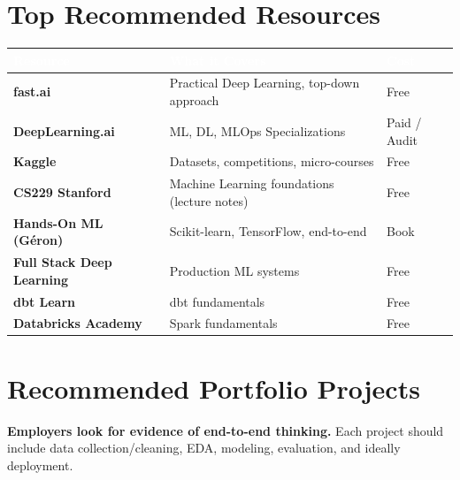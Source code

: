 \documentclass[a4paper,11pt]{article}
\begin{document}
\section{Top Recommended Resources}

\begin{tabularx}{\textwidth}{>{\bfseries}p{3.5cm} X p{3cm}}
\toprule
\rowcolor{primary}\textcolor{white}{\textbf{Resource}} & \textcolor{white}{\textbf{What it Covers}} & \textcolor{white}{\textbf{Cost}} \\
\midrule
\rowcolor{lightgray}fast.ai & Practical Deep Learning, top-down approach & Free \\
DeepLearning.ai & ML, DL, MLOps Specializations & Paid / Audit \\
\rowcolor{lightgray}Kaggle & Datasets, competitions, micro-courses & Free \\
CS229 Stanford & Machine Learning foundations (lecture notes) & Free \\
\rowcolor{lightgray}Hands-On ML (Géron) & Scikit-learn, TensorFlow, end-to-end & Book \\
Full Stack Deep Learning & Production ML systems & Free \\
\rowcolor{lightgray}dbt Learn & dbt fundamentals & Free \\
Databricks Academy & Spark fundamentals & Free \\
\bottomrule
\end{tabularx}

\section{Recommended Portfolio Projects}

\begin{infobox}
\textbf{Employers look for evidence of end-to-end thinking.} Each project should include data collection/cleaning, EDA, modeling, evaluation, and ideally deployment.
\end{infobox}
\end{document}
